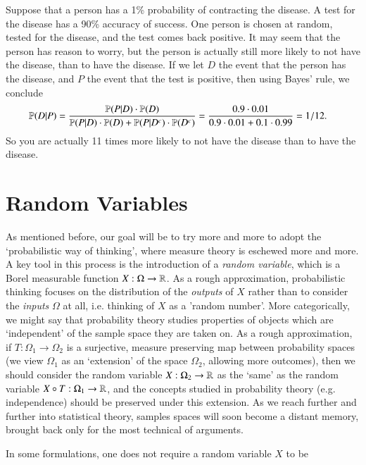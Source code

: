 \begin{example}
    Suppose that a person has a 1\% probability of contracting the disease. A test for the disease has a 90\% accuracy of success. One person is chosen at random, tested for the disease, and the test comes back positive. It may seem that the person has reason to worry, but the person is actually still more likely to not have the disease, than to have the disease. If we let $D$ the event that the person has the disease, and $P$ the event that the test is positive, then using Bayes' rule, we conclude
    \begin{align*}
        \mathbb{P}(D | P) &= \frac{\mathbb{P}(P|D) \cdot \mathbb{P}(D)}{\mathbb{P}(P|D) \cdot \mathbb{P}(D) + \mathbb{P}(P|D^c) \cdot \mathbb{P}(D^c)} = \frac{0.9 \cdot 0.01}{0.9 \cdot 0.01 + 0.1 \cdot 0.99} = 1/12.
    \end{align*}
    So you are actually 11 times more likely to not have the disease than to have the disease.
\end{example}


\chapter{Random Variables}

As mentioned before, our goal will be to try more and more to adopt the `probabilistic way of thinking', where measure theory is eschewed more and more. A key tool in this process is the introduction of a \emph{random variable}, which is a Borel measurable function $X: \Omega \to \operatorname{\mathbb{R}}$. As a rough approximation, probabilistic thinking focuses on the distribution of the \emph{outputs} of $X$ rather than to consider the \emph{inputs} $\Omega$ at all, i.e. thinking of $X$ as a 'random number'. More categorically, we might say that probability theory studies properties of objects which are `independent' of the sample space they are taken on. As a rough approximation, if $T: \Omega_1 \to \Omega_2$ is a surjective, measure preserving map between probability spaces (we view $\Omega_1$ as an `extension' of the space $\Omega_2$, allowing more outcomes), then we should consider the random variable $X: \Omega_2 \to \operatorname{\mathbb{R}}$ as the `same' as the random variable $X \circ T: \Omega_1 \to \operatorname{\mathbb{R}}$, and the concepts studied in probability theory (e.g. independence) should be preserved under this extension. As we reach further and further into statistical theory, samples spaces will soon become a distant memory, brought back only for the most technical of arguments.

In some formulations, one does not require a random variable $X$ to be 


